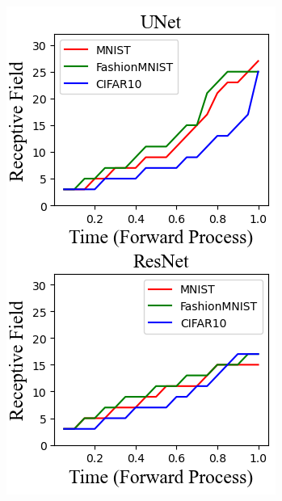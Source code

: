 \documentclass{article}
\theoremstyle{plain}
\theoremstyle{definition}
\theoremstyle{remark}
\begin{document}
\begin{figure}
\begin{subfigure}[b]{0.17\linewidth}
    \includegraphics[width=\linewidth,valign=b]{sjf2.png}
    \label{fig:scales_jacobianb}
    \vspace{-1em}
    \caption{}
    \end{subfigure}\hspace{10mm} 
    \begin{subfigure}[b]{0.16\linewidth}

\end{subfigure}
\end{figure}
\end{document}
